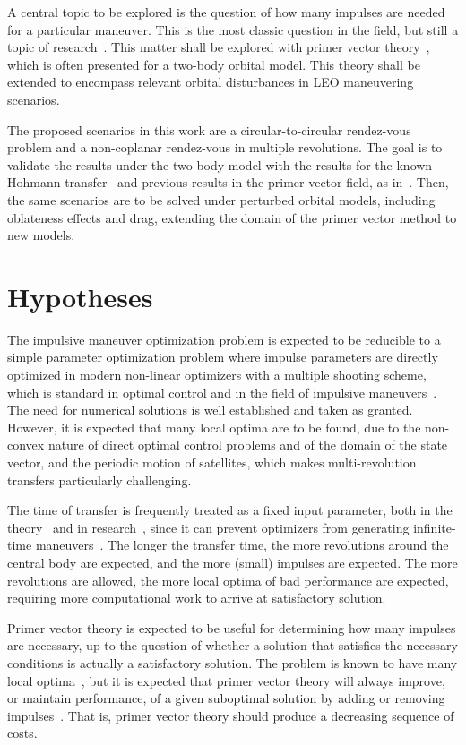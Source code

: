A central topic to be explored is the question of how many impulses are needed for a particular maneuver. This is the most classic question in the field, but still a topic of research~\cite{how_many_impulses}. This matter shall be explored with primer vector theory~\cite{Conway_2010}, which is often presented for a two-body orbital model. This theory shall be extended to encompass relevant orbital disturbances in LEO maneuvering scenarios.

The proposed scenarios in this work are a circular-to-circular rendez-vous problem and a non-coplanar rendez-vous in multiple revolutions. The goal is to validate the results under the two body model with the results for the known Hohmann transfer~\cite{curtis2015orbital} and previous results in the primer vector field, as in~. Then, the same scenarios are to be solved under perturbed orbital models, including oblateness effects and drag, extending the domain of the primer vector method to new models.

\section{Hypotheses}

The impulsive maneuver optimization problem is expected to be reducible to a simple parameter optimization problem where impulse parameters are directly optimized in modern non-linear optimizers with a multiple shooting scheme, which is standard in optimal control and in the field of impulsive maneuvers~\cite{impulsive_europa}. The need for numerical solutions is well established and taken as granted. However, it is expected that many local optima are to be found, due to the non-convex nature of direct optimal control problems and of the domain of the state vector, and the periodic motion of satellites, which makes multi-revolution transfers particularly challenging.

The time of transfer is frequently treated as a fixed input parameter, both in the theory~\cite{Conway_2010} and in research~\cite{fixed_time_primer_vector}, since it can prevent optimizers from generating infinite-time maneuvers~\cite{impulsive_europa}. The longer the transfer time, the more revolutions around the central body are expected, and the more (small) impulses are expected. The more revolutions are allowed, the more local optima of bad performance are expected, requiring more computational work to arrive at satisfactory solution.

Primer vector theory is expected to be useful for determining how many impulses are necessary, up to the question of whether a solution that satisfies the necessary conditions is actually a satisfactory solution. The problem is known to have many local optima~\cite{interactive_primer_vector}, but it is expected that primer vector theory will always improve, or maintain performance, of a given suboptimal solution by adding or removing impulses~\cite{Conway_2010}. That is, primer vector theory should produce a decreasing sequence of costs.

